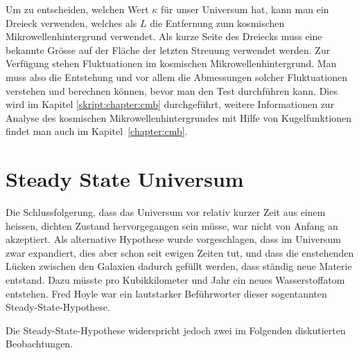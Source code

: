Um zu entscheiden, welchen Wert $\kappa$ für unser Universum hat,
kann man ein Dreieck verwenden, welches als $L$ die Entfernung zum kosmischen
Mikrowellenhintergrund verwendet.
Als kurze Seite des Dreiecks muss eine bekannte Grösse auf der
Fläche der letzten Streuung verwendet werden.
Zur Verfügung stehen Fluktuationen im kosmischen Mikrowellenhintergrund.
%
%
%
Man muss also die Entstehung und vor allem die Abmessungen solcher
Fluktuationen verstehen und berechnen können, bevor man den Test
durchführen kann.
Dies wird im Kapitel \ref{skript:chapter:cmb} durchgeführt, weitere
Informationen zur Analyse des kosmischen Mikrowellenhintergrundes
mit Hilfe von Kugelfunktionen findet man auch im Kapitel~\ref{chapter:cmb}.

\section{Steady State Universum}
Die Schlussfolgerung, dass das Universum vor relativ kurzer Zeit
aus einem heissen, dichten 
Zustand hervorgegangen sein müsse, war nicht von Anfang an akzeptiert.
Als alternative Hypothese wurde vorgeschlagen, dass im Universum 
zwar expandiert, dies aber schon seit ewigen Zeiten tut, und dass die
enstehenden
Lücken zwischen den Galaxien dadurch gefüllt werden, dass ständig
neue Materie entstand.
Dazu müsste pro Kubikkilometer und Jahr ein neues Wasserstoffatom
entstehen.
Fred Hoyle
war ein lautstarker Beführworter dieser sogentannten
Steady-State-Hypothese.
%

Die Steady-State-Hypothese widerspricht jedoch zwei
im Folgenden diskutierten Beobachtungen.

